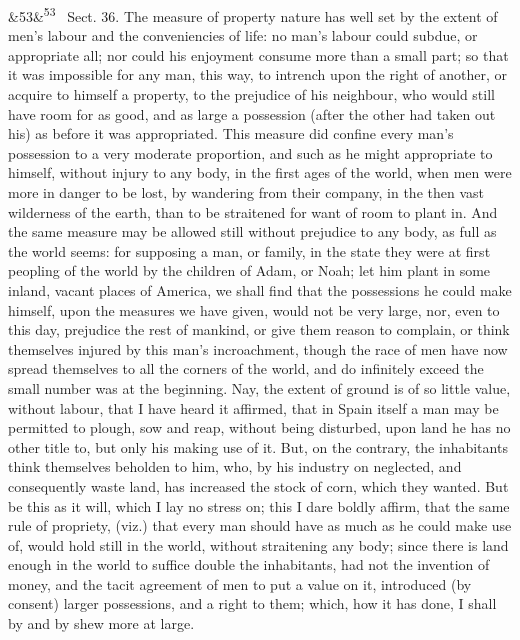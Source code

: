 \documentclass[12pt]{article}
\newcommand{\para}[1][]{\par\noindent\ifx&#1&\else\textsuperscript{\footnotesize #1}~\fi}
\begin{document}
\para[53] Sect. 36. The measure of property nature has well set by the extent of men's labour and the conveniencies of life: no man's labour could subdue, or appropriate all; nor could his enjoyment consume more than a small part; so that it was impossible for any man, this way, to intrench upon the right of another, or acquire to himself a property, to the prejudice of his neighbour, who would still have room for as good, and as large a possession (after the other had taken out his) as before it was appropriated. This measure did confine every man's possession to a very moderate proportion, and such as he might appropriate to himself, without injury to any body, in the first ages of the world, when men were more in danger to be lost, by wandering from their company, in the then vast wilderness of the earth, than to be straitened for want of room to plant in. And the same measure may be allowed still without prejudice to any body, as full as the world seems: for supposing a man, or family, in the state they were at first peopling of the world by the children of Adam, or Noah; let him plant in some inland, vacant places of America, we shall find that the possessions he could make himself, upon the measures we have given, would not be very large, nor, even to this day, prejudice the rest of mankind, or give them reason to complain, or think themselves injured by this man's incroachment, though the race of men have now spread themselves to all the corners of the world, and do infinitely exceed the small number was at the beginning. Nay, the extent of ground is of so little value, without labour, that I have heard it affirmed, that in Spain itself a man may be permitted to plough, sow and reap, without being disturbed, upon land he has no other title to, but only his making use of it. But, on the contrary, the inhabitants think themselves beholden to him, who, by his industry on neglected, and consequently waste land, has increased the stock of corn, which they wanted. But be this as it will, which I lay no stress on; this I dare boldly affirm, that the same rule of propriety, (viz.) that every man should have as much as he could make use of, would hold still in the world, without straitening any body; since there is land enough in the world to suffice double the inhabitants, had not the invention of money, and the tacit agreement of men to put a value on it, introduced (by consent) larger possessions, and a right to them; which, how it has done, I shall by and by shew more at large.
\end{document}
